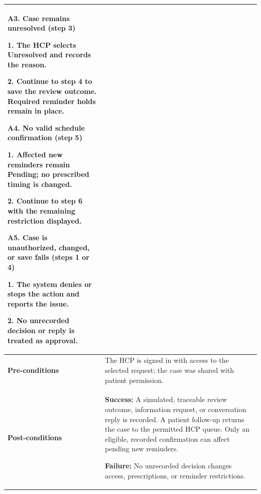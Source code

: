 \begin{longtable}{|p{}|p{}|}
\par\smallskip

\textbf{A3. Case remains unresolved (step 3)}\par
1. The HCP selects Unresolved and records the reason.\par
2. Continue to step 4 to save the review outcome. Required reminder holds remain in place.

\par\smallskip

\textbf{A4. No valid schedule confirmation (step 5)}\par
1. Affected new reminders remain Pending; no prescribed timing is changed.\par
2. Continue to step 6 with the remaining restriction displayed.

\par\smallskip

\textbf{A5. Case is unauthorized, changed, or save fails (steps 1 or 4)}\par
1. The system denies or stops the action and reports the issue.\par
2. No unrecorded decision or reply is treated as approval.
\\ \hline

\textbf{Pre-conditions} &
The HCP is signed in with access to the selected request; the case was shared with patient permission.
\\ \hline

\textbf{Post-conditions} &
\textbf{Success:} A simulated, traceable review outcome, information request, or conversation reply is recorded. A patient follow-up returns the case to the permitted HCP queue. Only an eligible, recorded confirmation can affect pending new reminders.\par
\textbf{Failure:} No unrecorded decision changes access, prescriptions, or reminder restrictions.
\\ \hline

\end{longtable}


